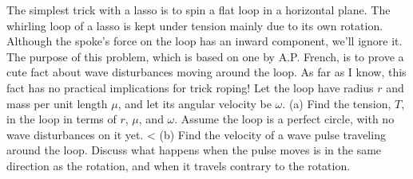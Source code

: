 The simplest trick with a lasso is to spin a flat loop in a horizontal
plane. The whirling loop of a lasso is kept under tension mainly due
to its own rotation. Although the spoke's force on the loop has an
inward component, we'll ignore it. The purpose of this problem,
which is based on one by A.P. French, is to prove a cute fact
about wave disturbances moving around the loop. As far as I
know, this fact has no practical implications for trick roping!
Let the loop have radius $r$ and mass per unit length $\mu$, 
and let its angular velocity be $\omega$.\hwendpart
(a) Find the
tension, $T$, in the loop in terms of $r$, $\mu$, and $\omega$. Assume
the loop is a perfect circle, with no wave disturbances on it yet.
<%
(b) Find the velocity of a wave pulse traveling around the
loop. Discuss what happens when the pulse moves is in the
same direction as the rotation, and when it travels contrary to the
rotation.
